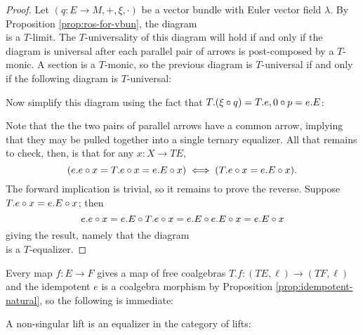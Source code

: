 \begin{proof}
  Let $(q:E \to M, +, \xi, \cdot)$ be a vector bundle with Euler vector field $\lambda$. By Proposition \ref{prop:ros-for-vbun}, the diagram \[\] is a $T$-limit. The $T$-universality of this diagram will hold if and only if the diagram is universal after each parallel pair of arrows is post-composed by a $T$-monic. A section is a $T$-monic, so the previous diagram is $T$-universal if and only if the following diagram is $T$-universal:
  
  Now simplify this diagram using the fact that $T.(\xi \circ q) = T.e, 0 \circ p = e.E$:
  
  Note that the the two pairs of parallel arrows have a common arrow, implying that they may be pulled together into a single ternary equalizer. All that remains to check, then, is that for any $x:X \to TE$,
  \[
  (e.e \circ x = T.e \circ x = e.E \circ x) \iff 
  (T.e \circ x = e.E \circ x). 
  \]
  The forward implication is trivial, so it remains to prove the reverse. 
  Suppose $T.e \circ x = e.E \circ x$; then
  \[
    e.e \circ x = e.E \circ T.e \circ x = e.E \circ e.E \circ x = e.E \circ x
  \]
  giving the result, namely that the diagram \[\] is a $T$-equalizer.
\end{proof}
Every map $f:E \to F$ gives a map of free coalgebras $T.f: (TE,\ell) \to (TF,\ell)$ and the idempotent $e$ is a coalgebra morphism by Proposition \ref{prop:idempotent-natural}, so the following is immediate:
\begin{proposition}%
  \label{def:non-singular-lift-eq-of-lifts}
  A non-singular lift is an equalizer in the category of lifts:
  \[
    
  \]
\end{proposition}
%     
%     

